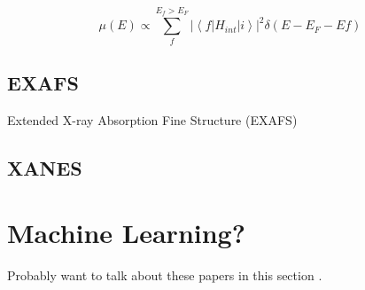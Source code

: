 \begin{equation}
    \label{FermisGoldenRule}
    \mu(E) \varpropto \sum_{f}^{E_f > E_F} \left\lvert \left\langle f \lvert H_{int} \rvert i \right\rangle \right\rvert ^2 \delta (E - E_F - Ef)  
\end{equation}

\subsection{EXAFS}
Extended X-ray Absorption Fine Structure (EXAFS)


\subsection{XANES}

\section{Machine Learning?}

Probably want to talk about these papers in this section \cite{timoshenko2018neural} \cite{Timoshenko2017}.